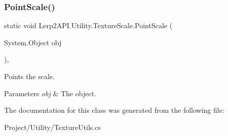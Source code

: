\subsubsection{\texorpdfstring{Point\+Scale()}{PointScale()}}
{\footnotesize\ttfamily static void Lerp2\+A\+P\+I.\+Utility.\+Texture\+Scale.\+Point\+Scale (\begin{DoxyParamCaption}\item[{System.\+Object}]{obj }\end{DoxyParamCaption})\hspace{0.3cm}{\ttfamily [inline]}, {\ttfamily [static]}}



Points the scale. 


\begin{DoxyParams}{Parameters}
{\em obj} & The object.\\
\hline
\end{DoxyParams}


The documentation for this class was generated from the following file\+:\begin{DoxyCompactItemize}
\item 
Project/\+Utility/Texture\+Utils.\+cs\end{DoxyCompactItemize}
